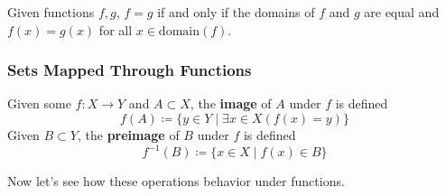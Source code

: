   \begin{lemma}
    \label{thm:equality-of-functions}
 
    Given functions $f, g$, $f = g$ if and only if the domains of $f$ and $g$ are equal and $f(x) = g(x)$ for all $x \in \mathrm{domain}(f)$. 
  \end{lemma} 

\subsubsection{Sets Mapped Through Functions}

  \begin{definition}
    \label{def:image-preimage}
    Given some $f: X \rightarrow Y$ and $A \subset X$, the \textbf{image} of $A$ under $f$ is defined 
    \begin{equation}
      f(A) \coloneqq \{y \in Y \mid \exists x \in X (f(x) = y)\}
    \end{equation}
    Given $B \subset Y$, the \textbf{preimage} of $B$ under $f$ is defined 
    \begin{equation}
      f^{-1} (B) \coloneqq \{ x \in X \mid f(x) \in B \}
    \end{equation}
  \end{definition} 

  Now let's see how these operations behavior under functions. 

